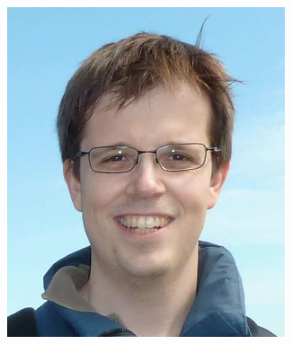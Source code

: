 \begin{frame}
\begin{columns}
\begin{column}{0.5\textwidth}
\begin{center}
\begin{minipage}{0.48\linewidth}
                    \centering
                \end{minipage}%
                \begin{minipage}{0.48\linewidth}
                   \includegraphics[width=\linewidth]{assets/timo.png}
                   \centering
                \end{minipage}%
            \end{center}
        \end{column}
    \end{columns}
\end{frame}

